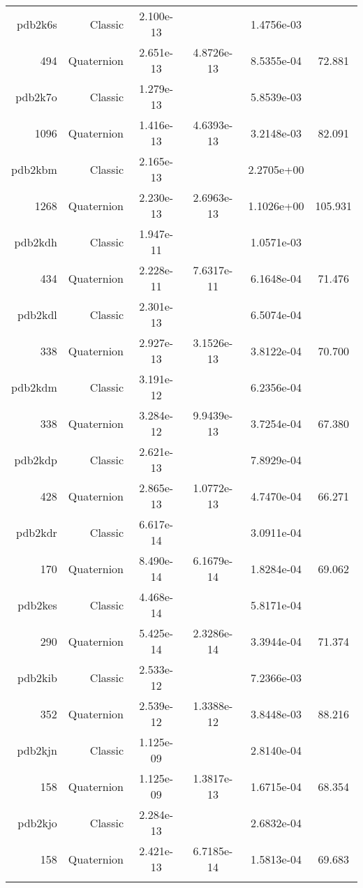 \begin{xltabular}{\textwidth}{r|rS[table-format=1.3e+2]S[table-format=1.4e+2]S[table-format=1.4e+2]S[table-format=-1.3]}
pdb2k6s & Classic & 2.100e-13 &  & 1.4756e-03 & \\
494 & Quaternion & 2.651e-13 & 4.8726e-13 & 8.5355e-04 & 72.881\\  \addlinespace
pdb2k7o & Classic & 1.279e-13 &  & 5.8539e-03 & \\
1096 & Quaternion & 1.416e-13 & 4.6393e-13 & 3.2148e-03 & 82.091\\  \addlinespace
pdb2kbm & Classic & 2.165e-13 &  & 2.2705e+00 & \\
1268 & Quaternion & 2.230e-13 & 2.6963e-13 & 1.1026e+00 & 105.931\\  \addlinespace
pdb2kdh & Classic & 1.947e-11 &  & 1.0571e-03 & \\
434 & Quaternion & 2.228e-11 & 7.6317e-11 & 6.1648e-04 & 71.476\\  \addlinespace
pdb2kdl & Classic & 2.301e-13 &  & 6.5074e-04 & \\
338 & Quaternion & 2.927e-13 & 3.1526e-13 & 3.8122e-04 & 70.700\\  \addlinespace
pdb2kdm & Classic & 3.191e-12 &  & 6.2356e-04 & \\
338 & Quaternion & 3.284e-12 & 9.9439e-13 & 3.7254e-04 & 67.380\\  \addlinespace
pdb2kdp & Classic & 2.621e-13 &  & 7.8929e-04 & \\
428 & Quaternion & 2.865e-13 & 1.0772e-13 & 4.7470e-04 & 66.271\\  \addlinespace
pdb2kdr & Classic & 6.617e-14 &  & 3.0911e-04 & \\
170 & Quaternion & 8.490e-14 & 6.1679e-14 & 1.8284e-04 & 69.062\\  \addlinespace
pdb2kes & Classic & 4.468e-14 &  & 5.8171e-04 & \\
290 & Quaternion & 5.425e-14 & 2.3286e-14 & 3.3944e-04 & 71.374\\  \addlinespace
pdb2kib & Classic & 2.533e-12 &  & 7.2366e-03 & \\
352 & Quaternion & 2.539e-12 & 1.3388e-12 & 3.8448e-03 & 88.216\\  \addlinespace
pdb2kjn & Classic & 1.125e-09 &  & 2.8140e-04 & \\
158 & Quaternion & 1.125e-09 & 1.3817e-13 & 1.6715e-04 & 68.354\\  \addlinespace
pdb2kjo & Classic & 2.284e-13 &  & 2.6832e-04 & \\
158 & Quaternion & 2.421e-13 & 6.7185e-14 & 1.5813e-04 & 69.683\\  \addlinespace

\end{xltabular}
